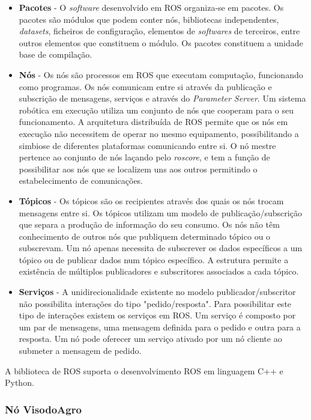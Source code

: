 \begin{itemize}
	\item \textbf{Pacotes} - O \textit{software} desenvolvido em ROS organiza-se em pacotes. Os pacotes são módulos que podem conter nós, bibliotecas independentes, \textit{datasets}, ficheiros de configuração, elementos de \textit{softwares} de terceiros, entre outros elementos que constituem o módulo. Os pacotes constituem a unidade base de compilação.
	\item \textbf{Nós} - Os nós são processos em ROS que executam computação, funcionando como programas. Os nós comunicam entre si através da publicação e subscrição de mensagens, serviços e através do \textit{Parameter Server}. Um sistema robótica em execução utiliza um conjunto de nós que cooperam para o seu funcionamento. A arquitetura distribuída de ROS permite que os nós em execução não necessitem de operar no mesmo equipamento, possibilitando a simbiose de diferentes plataformas comunicando entre si. O nó mestre pertence ao conjunto de nós laçando pelo \textit{roscore}, e tem a função de possibilitar aos nós que se localizem uns aos outros permitindo o estabelecimento de comunicações. 
	\item \textbf{Tópicos} - Os tópicos são os recipientes através dos quais os nós trocam mensagens  entre si. Os tópicos utilizam um modelo de publicação/subscrição que separa a produção de informação do seu consumo. Os nós não têm conhecimento de outros nós que publiquem determinado tópico ou o subscrevam. Um nó apenas necessita de subscrever os dados específicos a um tópico ou de publicar dados num tópico específico. A estrutura permite a existência de múltiplos publicadores e subscritores associados a cada tópico.
	\item \textbf{Serviços} - A unidirecionalidade existente no modelo publicador/subscritor não possibilita interações do tipo "pedido/resposta". Para possibilitar este tipo de interações existem os serviços em ROS. Um serviço é composto por um par de mensagens, uma mensagem definida para o pedido e outra para a resposta. Um nó pode oferecer um serviço ativado por um nó cliente ao submeter a mensagem de pedido.
 
\end{itemize}

A biblioteca de ROS suporta o desenvolvimento ROS em linguagem C++ e Python.


\subsubsection{Nó VisodoAgro}

